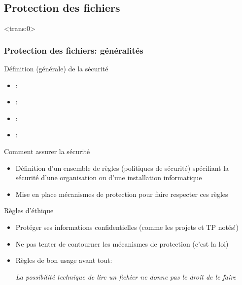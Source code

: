 \subsection{Protection des fichiers}
\begin{frame}<trans:0>\frametitle{Protection des fichiers: généralités}
  \begin{block}{Définition (générale) de la sécurité}
    \begin{itemize}
    \item {} : \vspace{-.5\baselineskip}
    \item {} : 
      \vspace{-.5\baselineskip}
    \item {} :  \vspace{-.5\baselineskip}
    \item {} : 
    \end{itemize}
  \end{block}\vspace{-.4\baselineskip}

  \begin{block}{Comment assurer la sécurité}
    \begin{itemize}
    \item Définition d'un ensemble de règles (politiques de sécurité)
      spécifiant la sécurité d'une organisation ou d'une installation
      informatique
    \item Mise en place \alert{mécanismes de protection} pour faire
      respecter ces règles
    \end{itemize}
  \end{block}\vspace{-.4\baselineskip}

  \begin{block}{Règles d'éthique}
    \begin{itemize}
    \item Protéger ses informations confidentielles (comme les projets et
      TP notés!)
    \item Ne pas tenter de contourner les mécanismes de protection (c'est
      la loi)
    \item Règles de bon usage avant tout:

      \textit{La possibilité technique de lire un fichier ne donne pas le
        droit de le faire}
    \end{itemize}
  \end{block}
     
\end{frame}
